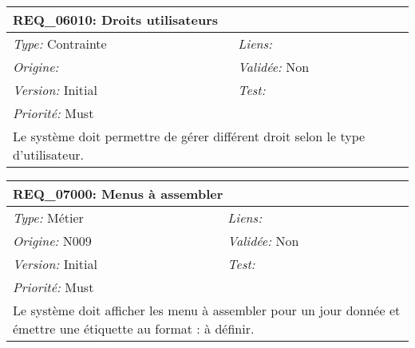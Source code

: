 \begin{table}[!h]

\begin{tabular}{|p{60mm}p{100mm}|}

\hline

\multicolumn{2}{|l|}{\textbf{REQ\_06010:} Droits utilisateurs} \\ \hline

\emph{Type:} Contrainte & \emph{Liens:}  \\

\emph{Origine:}  & \emph{Validée:} Non \\

\emph{Version:} Initial & \emph{Test:}  \\

\emph{Priorité:} Must & \\ \hline

\multicolumn{2}{|p{16cm}|}{Le système doit permettre de gérer différent droit selon le type d'utilisateur.} \\ \hline

\end{tabular}

\end{table}



\begin{table}[!h]

\begin{tabular}{|p{60mm}p{100mm}|}

\hline

\multicolumn{2}{|l|}{\textbf{REQ\_07000:} Menus à assembler} \\ \hline

\emph{Type:} Métier & \emph{Liens:}  \\

\emph{Origine:} N009 & \emph{Validée:} Non \\

\emph{Version:} Initial & \emph{Test:}  \\

\emph{Priorité:} Must & \\ \hline

\multicolumn{2}{|p{16cm}|}{Le système doit afficher les menu à assembler pour un jour donnée et émettre une étiquette au format : à définir.} \\ \hline

\end{tabular}

\end{table}



